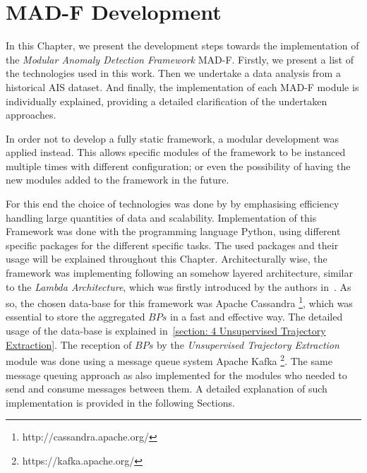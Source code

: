\chapter{MAD-F Development}
\label{chapter:Chapter 4}

In this Chapter, we present the development steps towards the implementation of the \emph{Modular Anomaly Detection Framework} MAD-F. Firstly, we present a list of the technologies used in this work. Then we undertake a data analysis from a historical AIS dataset. And finally, the implementation of each MAD-F module is individually  explained, providing a detailed clarification of the undertaken approaches.


In order not to develop a fully static framework, a modular development was applied instead. This allows specific modules of the framework to be instanced multiple times with different configuration; or even the possibility of having the new modules added to the framework in the future.

For this end the choice of technologies was done by by emphasising efficiency handling large quantities of data and scalability. Implementation of this Framework was done with the programming language Python, using different specific packages for the different specific tasks. The used packages and their usage will be explained throughout this Chapter. Architecturally wise, the framework was implementing following an somehow layered architecture, similar to the \emph{Lambda Architecture}, which was firstly introduced by the authors in~\cite{Marz2015BigSystems}. As so, the chosen data-base for this framework was Apache Cassandra \footnote{http://cassandra.apache.org/}, which was essential to store the aggregated $BPs$ in a fast and effective way. The detailed usage of the data-base is explained in~\ref{section: 4 Unsupervised Trajectory Extraction}. The reception of $BPs$ by the \emph{Unsupervised Trajectory Extraction} module was done using a message queue system Apache Kafka \footnote{https://kafka.apache.org/}. The same message queuing approach as also implemented for the modules who needed to send and consume messages between them. A detailed explanation of such implementation is provided in the following Sections.

